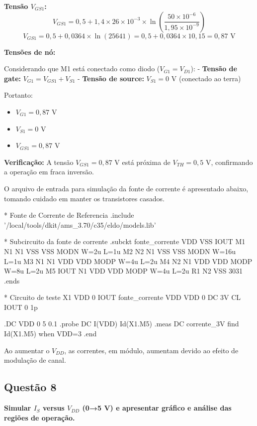 ﻿\documentclass[12pt,a4paper]{article}
\begin{document}
\textbf{Tensão $V_{GS1}$:}
$$V_{GS1} = 0,5 + 1,4 \times 26 \times 10^{-3} \times \ln\left(\frac{50 \times 10^{-6}}{1,95 \times 10^{-9}}\right)$$
$$V_{GS1} = 0,5 + 0,0364 \times \ln(25641) = 0,5 + 0,0364 \times 10,15 = 0,87 \text{ V}$$

\textbf{Tensões de nó:}

Considerando que M1 está conectado como diodo ($V_{G1} = V_{D1}$):
- \textbf{Tensão de gate:} $V_{G1} = V_{GS1} + V_{S1}$
- \textbf{Tensão de source:} $V_{S1} = 0$ V (conectado ao terra)

Portanto:
\begin{itemize}
    \item $V_{G1} = 0,87$ V
    \item $V_{S1} = 0$ V
    \item $V_{GS1} = 0,87$ V
\end{itemize}

\textbf{Verificação:} A tensão $V_{GS1} = 0,87$ V está próxima de $V_{TH} = 0,5$ V, confirmando a operação em fraca inversão.

O arquivo de entrada para simulação da fonte de corrente é apresentado abaixo, tomando cuidado em manter os transistores casados.

\begin{codeblock}[title={Arquivo de simulação da fonte de corrente}]
* Fonte de Corrente de Referencia
.include '/local/tools/dkit/ams_3.70/c35/eldo/models.lib'

* Subcircuito da fonte de corrente
.subckt fonte_corrente VDD VSS IOUT
M1 N1 N1 VSS VSS MODN W=2u L=1u
M2 N2 N1 VSS VSS MODN W=16u L=1u
M3 N1 N1 VDD VDD MODP W=4u L=2u
M4 N2 N1 VDD VDD MODP W=8u L=2u
M5 IOUT N1 VDD VDD MODP W=4u L=2u
R1 N2 VSS 3031
.ends

* Circuito de teste
X1 VDD 0 IOUT fonte_corrente
VDD VDD 0 DC 3V
CL IOUT 0 1p

.DC VDD 0 5 0.1
.probe DC I(VDD) Id(X1.M5)
.meas DC corrente_3V find Id(X1.M5) when VDD=3
.end
\end{codeblock}

Ao aumentar o $V_{DD}$, as correntes, em módulo, aumentam devido ao efeito de modulação de canal.

\subsection*{Questão 8}
	\textbf{Simular $I_S$ versus $V_{DD}$ (0→5 V) e apresentar gráfico e análise das regiões de operação.}
\end{document}
